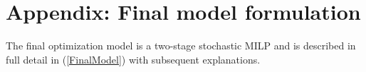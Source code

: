 {\appendices

\section*{Appendix: Final model formulation}\label{appendix:A}






\begingroup
\allowdisplaybreaks

The final optimization model is a two-stage stochastic MILP and is described in full detail in (\ref{FinalModel}) with subsequent explanations.




}
